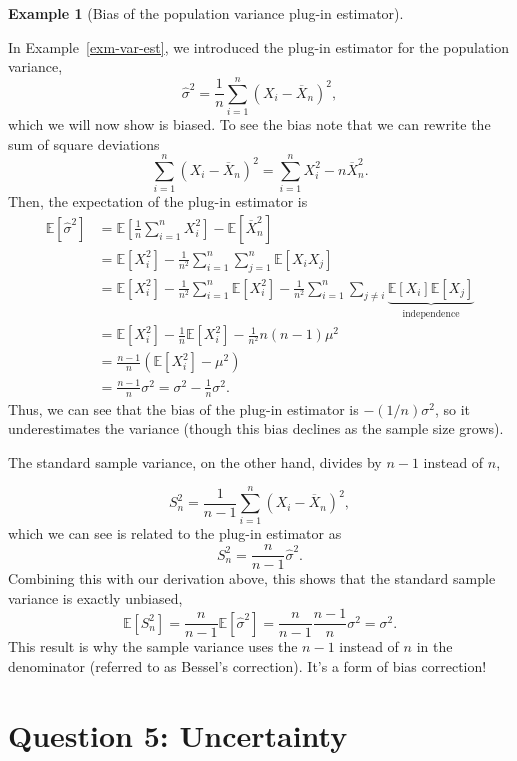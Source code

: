 \documentclass[
  13pt,
  letterpaper,
  DIV=11,
  numbers=noendperiod]{scrreprt}
\newcommand{\E}{\mathbb{E}}
\newcommand{\Xbar}{\overline{X}}
\theoremstyle{plain}
\theoremstyle{plain}
\theoremstyle{definition}
\theoremstyle{definition}
\newtheorem{example}{Example}[chapter]
\theoremstyle{remark}
\begin{document}
\begin{example}[Bias of the population variance plug-in
estimator]\protect\hypertarget{exm-bias-plugin-variance}{}\label{exm-bias-plugin-variance}

In Example~\ref{exm-var-est}, we introduced the plug-in estimator for
the population variance, \[
\widehat{\sigma}^2 = \frac{1}{n} \sum_{i=1}^n (X_i - \Xbar_n)^2,
\] which we will now show is biased. To see the bias note that we can
rewrite the sum of square deviations \[
\sum_{i=1}^n (X_i - \Xbar_n)^2 = \sum_{i=1}^n X_i^2 - n\Xbar_n^2.
\] Then, the expectation of the plug-in estimator is \[
\begin{aligned}
\E[\widehat{\sigma}^2] & = \E\left[\frac{1}{n}\sum_{i=1}^n X_i^2\right] - \E[\Xbar_n^2] \\
&= \E[X_i^2] - \frac{1}{n^2}\sum_{i=1}^n \sum_{j=1}^n \E[X_iX_j] \\
&= \E[X_i^2] - \frac{1}{n^2}\sum_{i=1}^n \E[X_i^2] - \frac{1}{n^2}\sum_{i=1}^n \sum_{j\neq i} \underbrace{\E[X_i]\E[X_j]}_{\text{independence}} \\
&= \E[X_i^2] - \frac{1}{n}\E[X_i^2] - \frac{1}{n^2} n(n-1)\mu^2 \\
&= \frac{n-1}{n} \left(\E[X_i^2] - \mu^2\right) \\
&= \frac{n-1}{n} \sigma^2 = \sigma^2 - \frac{1}{n}\sigma^2.
\end{aligned}
\] Thus, we can see that the bias of the plug-in estimator is
\(-(1/n)\sigma^2\), so it underestimates the variance (though this bias
declines as the sample size grows).

The standard sample variance, on the other hand, divides by \(n-1\)
instead of \(n\),

\[
S_n^2 = \frac{1}{n-1}\sum_{i=1}^n (X_i - \Xbar_n)^2,
\] which we can see is related to the plug-in estimator as \[
S_n^2 = \frac{n}{n-1}\widehat{\sigma}^2.
\] Combining this with our derivation above, this shows that the
standard sample variance is exactly unbiased, \[
\E[S_n^2] = \frac{n}{n-1}\E\left[\widehat{\sigma}^2\right] = \frac{n}{n-1}\frac{n-1}{n} \sigma^2 = \sigma^2.
\] This result is why the sample variance uses the \(n-1\) instead of
\(n\) in the denominator (referred to as Bessel's correction). It's a
form of bias correction!

\end{example}

\section{Question 5: Uncertainty}\label{question-5-uncertainty-1}
\end{document}
